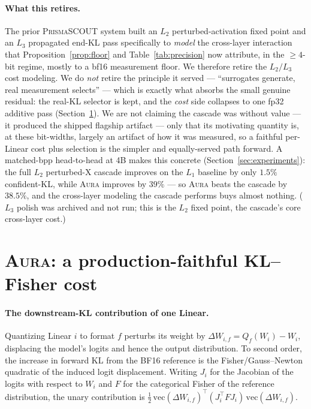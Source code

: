 \documentclass[11pt]{article}
\theoremstyle{plain}
\theoremstyle{definition}
\newcommand{\dW}{\Delta W}
\begin{document}
\paragraph{What this retires.} The prior \textsc{PrismaSCOUT} system built an
$L_2$ perturbed-activation fixed point and an $L_3$ propagated end-KL pass
specifically to \emph{model} the cross-layer interaction that
Proposition~\ref{prop:floor} and Table~\ref{tab:precision} now attribute, in the
$\ge 4$-bit regime, mostly to a bf16 measurement floor. We therefore retire the
$L_2/L_3$ cost modeling. We do \emph{not} retire the principle it served ---
``surrogates generate, real measurement selects'' --- which is exactly what
absorbs the small genuine residual: the real-KL selector is kept, and the
\emph{cost} side collapses to one fp32 additive pass (Section~\ref{sec:aura}).
We are not claiming the cascade was without value --- it produced the shipped
flagship artifact --- only that its motivating quantity is, at these bit-widths,
largely an artifact of how it was measured, so a faithful per-Linear cost plus
selection is the simpler and equally-served path forward. A matched-bpp
head-to-head at 4B makes this concrete (Section~\ref{sec:experiments}): the full
$L_2$ perturbed-X cascade improves on the $L_1$ baseline by only $1.5\%$
confident-KL, while \textsc{Aura} improves by $39\%$ --- so \textsc{Aura} beats
the cascade by $38.5\%$, and the cross-layer modeling the cascade performs buys
almost nothing. ($L_3$ polish was archived and not run; this is the $L_2$ fixed
point, the cascade's core cross-layer cost.)

\section{\textsc{Aura}: a production-faithful KL--Fisher cost}\label{sec:aura}

\paragraph{The downstream-KL contribution of one Linear.} Quantizing Linear $i$
to format $f$ perturbs its weight by $\dW_{i,f}=Q_f(W_i)-W_i$, displacing the
model's logits and hence the output distribution. To second order, the increase
in forward KL from the BF16 reference is the Fisher/Gauss--Newton quadratic of
the induced logit displacement. Writing $J_i$ for the Jacobian of the logits
with respect to $W_i$ and $F$ for the categorical Fisher of the reference
distribution, the unary contribution is
$\tfrac12\,\mathrm{vec}(\dW_{i,f})^\top (J_i^\top F J_i)\,\mathrm{vec}(\dW_{i,f})$.
\end{document}
